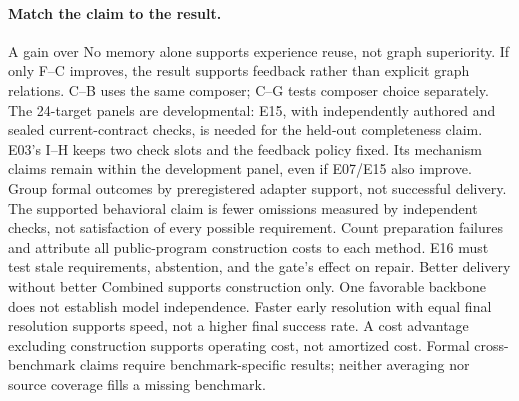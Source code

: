 \paragraph{Match the claim to the result.}
A gain over No memory alone supports experience reuse, not graph superiority.
If only F--C improves, the result supports feedback rather than explicit graph
relations. C--B uses the same composer; C--G tests composer choice separately.
The 24-target panels are developmental: E15, with independently authored and
sealed current-contract checks, is needed for the held-out completeness claim.
E03's I--H keeps two check slots and the feedback policy fixed. Its mechanism
claims remain within the development panel, even if E07/E15 also improve.
Group formal outcomes by preregistered adapter support, not successful delivery.
The supported behavioral claim is fewer omissions measured by independent
checks, not satisfaction of every possible requirement. Count preparation
failures and attribute all public-program construction costs to each method.
E16 must test stale requirements, abstention, and the gate's effect on repair.
Better delivery without better Combined supports construction only.
One favorable backbone does not establish model independence. Faster early
resolution with equal final resolution supports speed, not a higher final
success rate. A cost advantage excluding construction supports operating cost,
not amortized cost. Formal cross-benchmark claims require benchmark-specific
results; neither averaging nor source coverage fills a missing benchmark.

\clearpage
